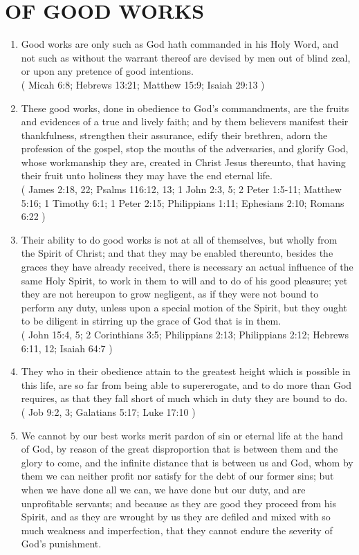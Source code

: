 \documentclass[12pt,a4paper]{book}
\begin{document}
\chapter{OF GOOD WORKS}
\label{ch-good-wor}
\begin{enumerate}
\item Good works are only such as God hath commanded in his Holy Word, and not such as without the warrant thereof are devised by men out of blind zeal, or upon any pretence of good intentions.\\
( Micah 6:8; Hebrews 13:21; Matthew 15:9; Isaiah 29:13 )
\item These good works, done in obedience to God's commandments, are the fruits and evidences of a true and lively faith; and by them believers manifest their thankfulness, strengthen their assurance, edify their brethren, adorn the profession of the gospel, stop the mouths of the adversaries, and glorify God, whose workmanship they are, created in Christ Jesus thereunto, that having their fruit unto holiness they may have the end eternal life.\\
( James 2:18, 22; Psalms 116:12, 13; 1 John 2:3, 5; 2 Peter 1:5-11; Matthew 5:16; 1 Timothy 6:1; 1 Peter 2:15; Philippians 1:11; Ephesians 2:10; Romans 6:22 )
\item Their ability to do good works is not at all of themselves, but wholly from the Spirit of Christ; and that they may be enabled thereunto, besides the graces they have already received, there is necessary an actual influence of the same Holy Spirit, to work in them to will and to do of his good pleasure; yet they are not hereupon to grow negligent, as if they were not bound to perform any duty, unless upon a special motion of the Spirit, but they ought to be diligent in stirring up the grace of God that is in them.\\
( John 15:4, 5; 2 Corinthians 3:5; Philippians 2:13; Philippians 2:12; Hebrews 6:11, 12; Isaiah 64:7 )
\item They who in their obedience attain to the greatest height which is possible in this life, are so far from being able to supererogate, and to do more than God requires, as that they fall short of much which in duty they are bound to do.\\
( Job 9:2, 3; Galatians 5:17; Luke 17:10 )
\item We cannot by our best works merit pardon of sin or eternal life at the hand of God, by reason of the great disproportion that is between them and the glory to come, and the infinite distance that is between us and God, whom by them we can neither profit nor satisfy for the debt of our former sins; but when we have done all we can, we have done but our duty, and are unprofitable servants; and because as they are good they proceed from his Spirit, and as they are wrought by us they are defiled and mixed with so much weakness and imperfection, that they cannot endure the severity of God's punishment.\\

\end{enumerate}
\end{document}
